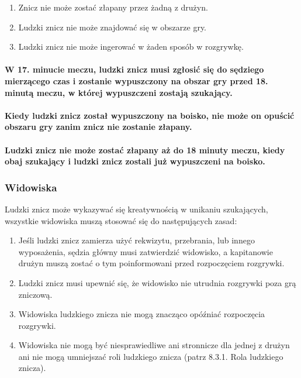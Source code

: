 \documentclass[12pt]{article}
\begin{document}
\begin{enumerate}
	\item Znicz nie może zostać złapany przez żadną z drużyn.

	\item Ludzki znicz nie może znajdować się w obszarze gry.

	\item Ludzki znicz nie może ingerować w żaden sposób w rozgrywkę.
\end{enumerate}

\paragraph{W 17. minucie meczu, ludzki znicz musi zgłosić się do
	sędziego mierzącego czas i zostanie wypuszczony na obszar gry przed 18.
	minutą meczu, w której wypuszczeni zostają szukający.}

\paragraph{Kiedy ludzki znicz został wypuszczony na boisko, nie
	może on opuścić obszaru gry zanim znicz nie zostanie złapany.}

\paragraph{Ludzki znicz nie może zostać złapany aż do 18 minuty
	meczu, kiedy obaj szukający i ludzki znicz zostali już wypuszczeni na
	boisko.}

\subsubsection{Widowiska}

Ludzki znicz może wykazywać się kreatywnością w unikaniu szukających,
wszystkie widowiska muszą stosować się do następujących zasad:

\begin{enumerate}
	\item
	      Jeśli ludzki znicz zamierza użyć rekwizytu, przebrania, lub innego
	      wyposażenia, sędzia główny musi zatwierdzić widowisko, a kapitanowie
	      drużyn muszą zostać o tym poinformowani przed rozpoczęciem rozgrywki.
	\item
	      Ludzki znicz musi upewnić się, że widowisko nie utrudnia rozgrywki
	      poza grą zniczową.
	\item
	      Widowiska ludzkiego znicza nie mogą znacząco opóźniać rozpoczęcia
	      rozgrywki.
	\item
	      Widowiska nie mogą być niesprawiedliwe ani stronnicze dla jednej z
	      drużyn ani nie mogą umniejszać roli ludzkiego znicza (patrz 8.3.1.
	      Rola ludzkiego znicza).
\end{enumerate}
\end{document}
